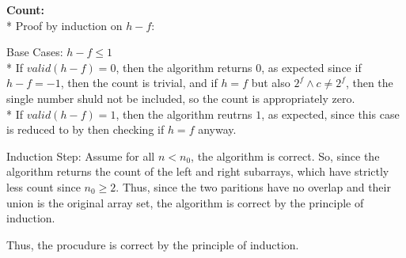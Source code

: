 \documentclass[letterpaper, reqno, 11pt]{article}
\begin{document}
\begin{description}
	\pagebreak
	\item{\bf Count:}\\*
	Proof by induction on $h-f$:
	\begin{description}
		\item{Base Cases:} $h-f\leq1$\\*
		If $valid(h-f)=0$, then the algorithm returns $0$, as expected
		since if $h-f=-1$, then the count is trivial, and if
		$h=f$ but also $2^f\land c\neq 2^f$, then the single number
		shuld not be included, so the count is appropriately zero.\\*
		If $valid(h-f)=1$, then the algorithm reutrns $1$, as expected,
		since this case is reduced to by then checking if $h=f$ anyway.
		\item{Induction Step:}
		Assume for all $n<n_0$, the algorithm is correct.
		So, since the algorithm returns the count of the left and right
		subarrays, which have strictly less count since $n_0\geq 2$.
		Thus, since the two paritions have no overlap and their union
		is the original array set, the algorithm is correct by the principle
		of induction.
	\end{description}
	Thus, the procudure is correct by the principle of induction.


\end{description}
\end{document}
